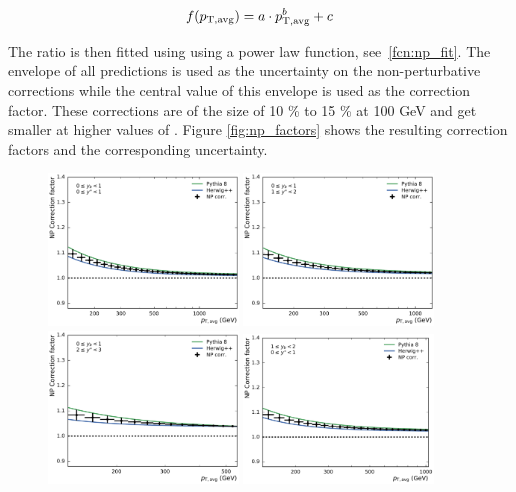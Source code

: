 \begin{equation}
  f(p_{\mathrm{T,avg}}) = a \cdot p_{\mathrm{T,avg}}^b + c
  \label{fcn:np_fit}
\end{equation}

The ratio is then fitted using  using a power law function,
see~\ref{fcn:np_fit}.  The envelope of all predictions is used as the
uncertainty on the non-perturbative corrections while the central value of this
envelope is used as the correction factor.  These corrections are of the size of
10 \% to 15 \% at 100 \si{GeV} and get smaller at higher values of \ptavg. Figure
\ref{fig:np_factors} shows the resulting correction factors and the
corresponding uncertainty.

\begin{figure}[htp]
    \centering
    \includegraphics[width=0.45\textwidth]{figures/theory/np_factors_calc_yb0ys0.pdf}\hfill
    \includegraphics[width=0.45\textwidth]{figures/theory/np_factors_calc_yb0ys1.pdf}
    \includegraphics[width=0.45\textwidth]{figures/theory/np_factors_calc_yb0ys2.pdf}\hfill
    \includegraphics[width=0.45\textwidth]{figures/theory/np_factors_calc_yb1ys0.pdf}

\end{figure}
